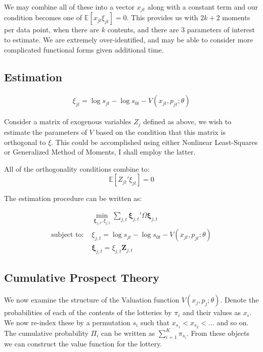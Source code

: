\documentclass[12pt]{paper}
\newcommand{\exV}[1]{\mathbb{E} \left [ #1 \right ]}
\begin{document}
We may combine all of these into a vector $x_{jt}$ along with a
constant term and our condition becomes one of
$\exV{x_{jt}\xi_{jt}} = 0$. This provides us with $2k + 2$ moments per
data point, when there are $k$ contents, and there are $3$
parameters of interest to estimate. We are extremely over-identified,
and may be able to consider more complicated functional forms given
additional time.


\subsection{Estimation}

\begin{align*}
  \xi_{jt} = \log s_{jt} - \log s_{0t} - V( x_{jt}, p_{jt}; \theta)
\end{align*}


Consider a matrix of exogenous variables $Z_j$ defined as above, we wish
to estimate the parameters of $V$ based on the condition that this
matrix is orthogonal to $\xi$. This could be accomplished using either
Nonlinear Least-Squares or Generalized Method of Moments, I shall
employ the latter.

All of the orthogonality conditions combine to:
\begin{equation*}
  \exV{Z_{jt}'\xi_{jt}} = 0
\end{equation*}

The estimation procedure can be written as:

\begin{align}
  &\min_{\bm{\xi}_{j,t}, \xi_{j,t}} \sum_{j,t}\bm{\xi}_{j,t}' \Omega \bm{\xi}_{j,t}\\
  \text{subject to: } &\xi_{j,t} = \log s_{jt} - \log s_{0t} - V( x_{jt}, p_{jt}; \theta)\\
  &\bm{\xi}_{j,t} = \xi_{j,t} \bm{Z}_{j,t}  
\end{align}



\subsection{Cumulative Prospect Theory}


We now examine the structure of the Valuation function $V( x_j,
p_j; \theta)$. Denote the probabilities of each of the contents of the
lotteries by $\pi_i$ and their values as $x_i$. We now re-index these by
a permutation $s_i$ such that $x_{s_1} < x_{s_2} < ...$ and so on. The
cumulative probability $\Pi_i$ can be written as $\sum_{i=1}^K
\pi_{s_i}$. From these objects we can construct the value function for
the lottery.
\end{document}
